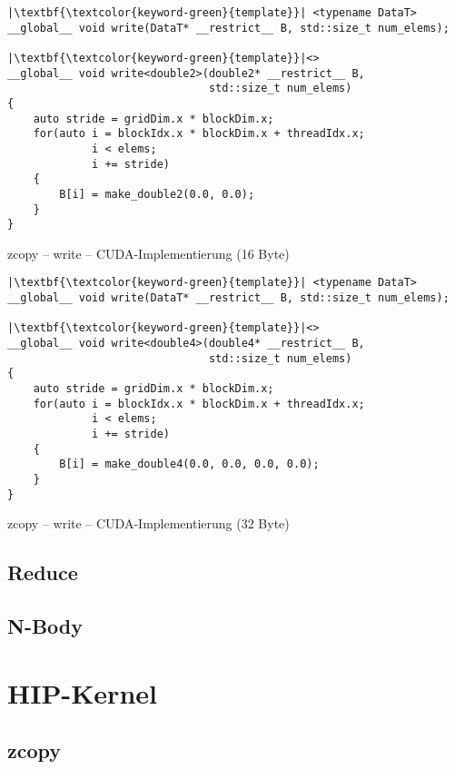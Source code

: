 \begin{code}
    \begin{verbatim}
|\textbf{\textcolor{keyword-green}{template}}| <typename DataT>
__global__ void write(DataT* __restrict__ B, std::size_t num_elems);

|\textbf{\textcolor{keyword-green}{template}}|<>
__global__ void write<double2>(double2* __restrict__ B,
                               std::size_t num_elems)
{
    auto stride = gridDim.x * blockDim.x;
    for(auto i = blockIdx.x * blockDim.x + threadIdx.x;
             i < elems;
             i += stride)
    {
        B[i] = make_double2(0.0, 0.0);
    }
}
    \end{verbatim}
    \caption{zcopy -- write -- CUDA-Implementierung (16 Byte)}
    \label{anhang:cuda:zcopyw16}
\end{code}

\begin{code}
    \begin{verbatim}
|\textbf{\textcolor{keyword-green}{template}}| <typename DataT>
__global__ void write(DataT* __restrict__ B, std::size_t num_elems);

|\textbf{\textcolor{keyword-green}{template}}|<>
__global__ void write<double4>(double4* __restrict__ B,
                               std::size_t num_elems)
{
    auto stride = gridDim.x * blockDim.x;
    for(auto i = blockIdx.x * blockDim.x + threadIdx.x;
             i < elems;
             i += stride)
    {
        B[i] = make_double4(0.0, 0.0, 0.0, 0.0);
    }
}
    \end{verbatim}
    \caption{zcopy -- write -- CUDA-Implementierung (32 Byte)}
    \label{anhang:cuda:zcopyw32}
\end{code}

\subsection{Reduce}

\subsection{N-Body}

\section{HIP-Kernel}

\subsection{zcopy}

